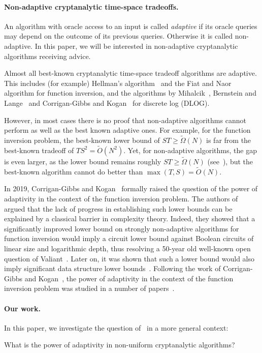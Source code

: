 \documentclass[11pt]{article}
\begin{document}
\paragraph{Non-adaptive cryptanalytic time-space tradeoffs.}
An algorithm with oracle access to an input is called \emph{adaptive} if its oracle queries may depend on the outcome of its previous queries. Otherwise it is called non-adaptive.
In this paper, we will be interested in non-adaptive cryptanalytic algorithms receiving advice. 

Almost all best-known cryptanalytic time-space tradeoff algorithms are adaptive. This includes (for example) Hellman's algorithm~\cite{Hellman80} and the Fiat and Naor~\cite{FiatN99} algorithm for function inversion, and the algorithms by 
Mihalcik~\cite{Mih10}, Bernstein and Lange~\cite{BernsteinL13} and Corrigan-Gibbs and Kogan~\cite{Corrigan-GibbsK18} for discrete log (DLOG).

However, in most cases there is no proof that non-adaptive algorithms cannot perform as well as the best known adaptive ones. For example, for the function inversion problem, the best-known lower bound of $ST \geq \tilde{\Omega}(N)$ is far from the best-known tradeoff of $T S^2 = \tilde{O}(N^2)$. Yet, for non-adaptive algorithms, the gap is even larger, as the lower bound remains roughly $ST \geq \tilde{\Omega}(N)$ (see~\cite{GajulapalliGK24}), but the best-known algorithm 
cannot do better than $\max(T,S) = \tilde{O}(N)$.

In 2019, Corrigan-Gibbs and Kogan~\cite{Corrigan-GibbsK19} formally raised the question of the power of adaptivity in the context of the function inversion problem. 
The authors of~\cite{Corrigan-GibbsK19} argued that the lack of progress in establishing such lower bounds can be explained by a classical barrier in complexity theory. Indeed, they showed that a significantly improved lower bound on strongly non-adaptive algorithms for function inversion would imply a circuit lower bound against Boolean circuits of linear size and logarithmic depth, thus resolving a 50-year old well-known open question of Valiant~\cite{Valiant77}. Later on, it was shown that such a lower bound would also imply significant data structure lower bounds~\cite{DvorakKKS21,GolovnevGHPV20}. Following the work of Corrigan-Gibbs and Kogan~\cite{Corrigan-GibbsK19}, the power of adaptivity in the context of the function inversion problem was studied in a number of papers~\cite{ChawinHM20,DvorakKKS21, GajulapalliGK24,GolovnevGPS23}. 

\paragraph{Our work.} In this paper, we investigate the question of~\cite{Corrigan-GibbsK19} in a more general context:
\begin{center}
    What is the power of adaptivity in non-uniform cryptanalytic algorithms?
\end{center}
\end{document}
